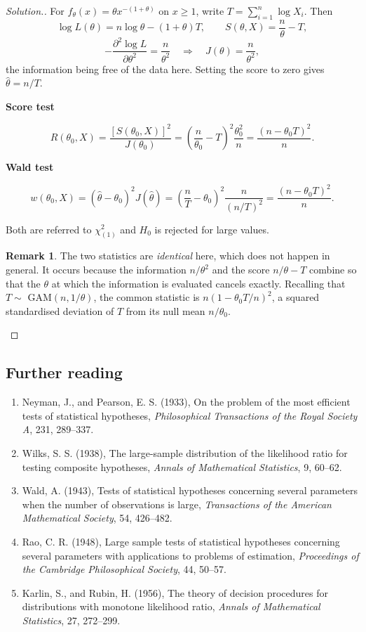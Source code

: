 \documentclass[12pt,a4paper]{report}
\theoremstyle{definition}
\newtheorem*{remark}{Remark}
\newcommand{\subhead}[1]{%
  \par\medskip\noindent\textbf{#1}\par\nobreak\smallskip}
\newenvironment{solution}
  {\renewcommand{\qedsymbol}{}\begin{proof}[\textit{Solution}.]}
  {\end{proof}}
\begin{document}
\begin{solution}
For $f_{\theta}(x)=\theta x^{-(1+\theta)}$ on $x\geq1$, write
$T=\sum_{i=1}^{n}\log X_i$. Then
\[\log L(\theta) = n\log\theta - (1+\theta)T,\qquad
S(\theta,X) = \frac{n}{\theta} - T,\]
\[-\frac{\partial^{2}\log L}{\partial\theta^{2}} = \frac{n}{\theta^{2}}
\quad\Longrightarrow\quad J(\theta) = \frac{n}{\theta^{2}},\]
the information being free of the data here. Setting the score to zero gives
$\widehat{\theta} = n/T$.

\subhead{Score test}
\[R(\theta_0,X) = \frac{\left[S(\theta_0,X)\right]^{2}}{J(\theta_0)}
= \left(\frac{n}{\theta_0}-T\right)^{2}\frac{\theta_0^{2}}{n}
= \frac{\left(n-\theta_0 T\right)^{2}}{n} .\]

\subhead{Wald test}
\[w(\theta_0,X) = \left(\widehat{\theta}-\theta_0\right)^{2}J\left(\widehat{\theta}\right)
= \left(\frac{n}{T}-\theta_0\right)^{2}\frac{n}{\left(n/T\right)^{2}}
= \frac{\left(n-\theta_0T\right)^{2}}{n} .\]

Both are referred to $\chi^{2}_{(1)}$ and $H_0$ is rejected for large values.

\begin{remark}
The two statistics are \emph{identical} here, which does not happen in general.
It occurs because the information $n/\theta^{2}$ and the score $n/\theta - T$
combine so that the $\theta$ at which the information is evaluated cancels
exactly. Recalling that $T\sim$ GAM$(n,1/\theta)$, the common statistic is
$n\left(1-\theta_0T/n\right)^{2}$, a squared standardised deviation of $T$ from
its null mean $n/\theta_0$.
\end{remark}
\end{solution}

\subsection*{Further reading}
\begin{enumerate}
\item Neyman, J., and Pearson, E. S. (1933), On the problem of the most efficient
tests of statistical hypotheses, \emph{Philosophical Transactions of the Royal
Society A}, 231, 289--337.
\item Wilks, S. S. (1938), The large-sample distribution of the likelihood ratio
for testing composite hypotheses, \emph{Annals of Mathematical Statistics}, 9,
60--62.
\item Wald, A. (1943), Tests of statistical hypotheses concerning several
parameters when the number of observations is large, \emph{Transactions of the
American Mathematical Society}, 54, 426--482.
\item Rao, C. R. (1948), Large sample tests of statistical hypotheses concerning
several parameters with applications to problems of estimation, \emph{Proceedings
of the Cambridge Philosophical Society}, 44, 50--57.
\item Karlin, S., and Rubin, H. (1956), The theory of decision procedures for
distributions with monotone likelihood ratio, \emph{Annals of Mathematical
Statistics}, 27, 272--299.
\end{enumerate}
\end{document}
